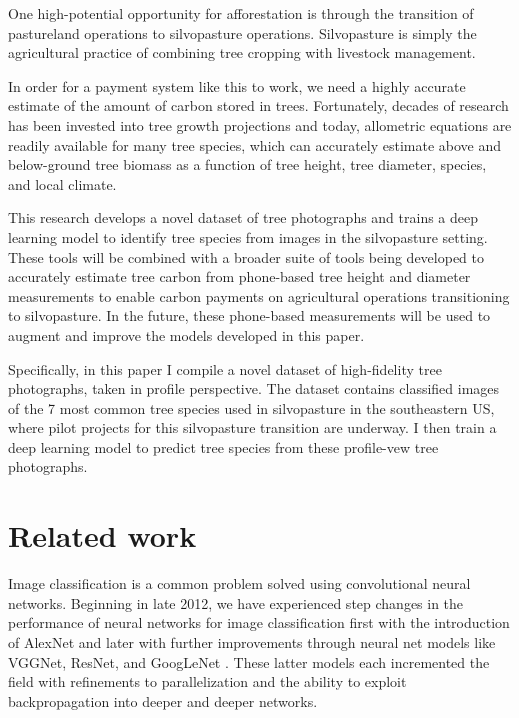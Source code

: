 \documentclass[10pt,twocolumn,letterpaper]{article}
\begin{document}
One high-potential opportunity for afforestation is through the transition of pastureland operations to silvopasture operations. Silvopasture is simply the agricultural practice of combining tree cropping with livestock management. 

In order for a payment system like this to work, we need a highly accurate estimate of the amount of carbon stored in trees. Fortunately, decades of research has been invested into tree growth projections and today, allometric equations are readily available for many tree species, which can accurately estimate above and below-ground tree biomass as a function of tree height, tree diameter, species, and local climate. 

This research develops a novel dataset of tree photographs and trains a deep learning model to identify tree species from images in the silvopasture setting. These tools will be combined with a broader suite of tools being developed to accurately estimate tree carbon from phone-based tree height and diameter measurements to enable carbon payments on agricultural operations transitioning to silvopasture. In the future, these phone-based measurements will be used to augment and improve the models developed in this paper.

Specifically, in this paper I compile a novel dataset of high-fidelity tree photographs, taken in profile perspective. The dataset contains classified images of the 7 most common tree species used in silvopasture in the southeastern US, where pilot projects for this silvopasture transition are underway. I then train a deep learning model to predict tree species from these profile-vew tree photographs.

\section{Related work}
\label{sec:litreview}

Image classification is a common problem solved using convolutional neural networks. Beginning in late 2012, we have experienced step changes in the performance of neural networks for image classification first with the introduction of AlexNet and later with further improvements through neural net models like VGGNet, ResNet, and GoogLeNet \cite{VGGNet, GoogLeNET, ResNET}. These latter models each incremented the field with refinements to parallelization and the ability to exploit backpropagation into deeper and deeper networks.
\end{document}
